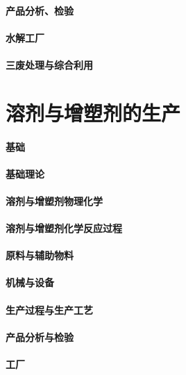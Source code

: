 \documentclass[UTF8]{../../ApplicationUniverse}
\begin{document}
    \subsubsection{产品分析、检验}
    \subsubsection{水解工厂}
    \subsubsection{三废处理与综合利用}










\chapter{溶剂与增塑剂的生产}
\subsubsection{基础}
    \subsubsection{基础理论}
        \subsubsection{溶剂与增塑剂物理化学}
    \subsubsection{溶剂与增塑剂化学反应过程}
    \subsubsection{原料与辅助物料}
    \subsubsection{机械与设备}
    \subsubsection{生产过程与生产工艺}
    \subsubsection{产品分析与检验}
    \subsubsection{工厂}
\end{document}
